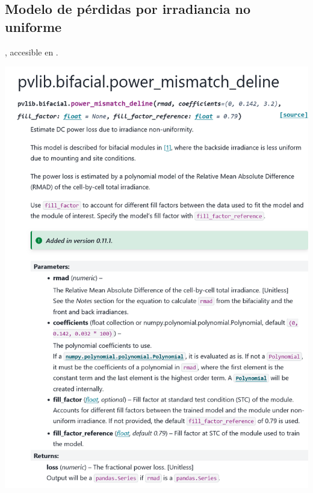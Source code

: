 \begin{myparindent}{0pt}
\newpage\section{Modelo de pérdidas por irradiancia no uniforme} \label{sct:doc_modelo_ajuste_no_uniformidad}

, accesible en .

\includegraphics[width=\linewidth,height=0.9\textheight,keepaspectratio]{images/docs_funcs_cut/power_mismatch_deline_0.png}


\end{myparindent}
